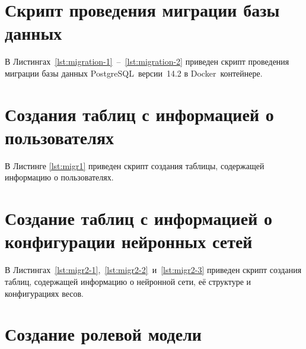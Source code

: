 \begin{appendices}
    \chapter{Скрипт проведения миграции базы данных}
	
	В Листингах~\ref{lst:migration-1}~--~\ref{lst:migration-2} приведен скрипт проведения миграции базы данных PostgreSQL~версии~14.2 в Docker~контейнере.
	
	
	\newpage
	

	\chapter{Создания таблиц с информацией о пользователях}
	
	В Листинге \ref{lst:migr1} приведен скрипт создания таблицы, содержащей информацию о пользователях.
	
	
	\chapter{Создание таблиц с информацией о конфигурации нейронных сетей}
	
	В Листингах~\ref{lst:migr2-1},~\ref{lst:migr2-2}~и~\ref{lst:migr2-3} приведен скрипт создания таблиц, содержащей информацию о нейронной сети, её структуре и конфигурациях весов.
	
	
	\newpage
	
	
	\newpage
	
	
	\chapter{Создание ролевой модели}
	

\end{appendices}
